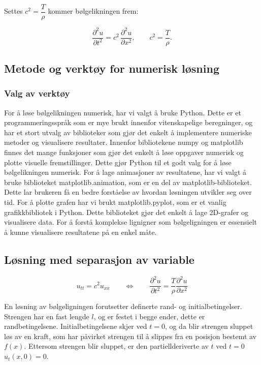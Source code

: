 Settes \(c^2=\dfrac{T}{\rho}\) kommer bølgelikningen frem: 

\begin{equation}
  \frac{\partial^2 u}{\partial t^2}
  = c^2\,\frac{\partial^2 u}{\partial x^2},
  \qquad
  c^2=\frac{T}{\rho}.
  \label{eq:utledetBolgelikning}
\end{equation}

\subsection{Metode og verktøy for numerisk løsning}
\subsubsection{Valg av verktøy}
For å løse bølgelikningen numerisk, har vi valgt å bruke Python. Dette er et programmeringsspråk som er mye brukt innenfor vitenskapelige
beregninger, og har et stort utvalg av biblioteker som gjør det enkelt å implementere numeriske metoder og visualisere resultater. Innenfor 
bibliotekene numpy og matplotlib finnes det mange funksjoner som gjør det enkelt å løse oppgaver numerisk og plotte visuelle fremstillinger.
Dette gjør Python til et godt valg for å løse bølgelikningen numerisk. For å lage animasjoner av resultatene, har vi valgt å bruke biblioteket 
matplotlib.animation, som er en del av matplotlib-biblioteket. Dette lar brukeren få en bedre forståelse av hvordan løsningen utvikler seg over tid.
For å plotte grafen har vi brukt matplotlib.pyplot, som er et vanlig grafikkbibliotek i Python. Dette biblioteket gjør det enkelt å lage 2D-grafer og 
visualisere data. For å forstå komplekse lignigner som bølgeligningen er essensielt å kunne visualisere resultatene på en enkel måte.

\subsection{Løsning med separasjon av variable}
\begin{equation}
	u_{tt} = c^2 u_{xx} \qquad \iff \qquad 
	\frac{\partial^2 u}{\partial t^2} = \frac{T}{\rho} \frac{\partial^2 u}{\partial x^2}	
	\label{eq:bølgelikningForLøsning}
\end{equation}

En løsning av bølgeligningen forutsetter definerte rand- og initialbetingelser. Strengen har en fast lengde $l$,
og er festet i begge ender, dette er randbetingelsene. Initialbetingelsene skjer ved $t=0$, og da blir strengen
sluppet løs av en kraft, som har påvirket strengen til å slippes fra en posisjon bestemt av $f(x)$.
Ettersom strengen blir sluppet, er den partiellderiverte av $t$ ved $t=0$ $u_t(x,0) = 0$.

